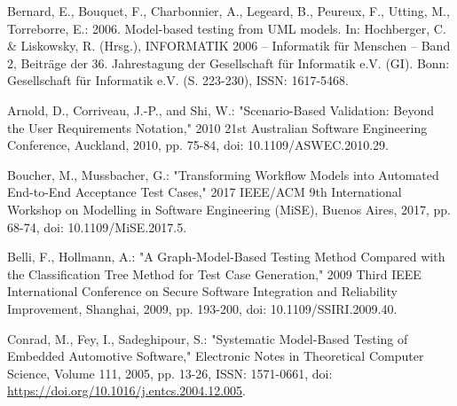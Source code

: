 \documentclass[a4paper,10pt, bibliography=totocnumbered]{scrreprt}
\begin{document}
\begin{thebibliography}{9}
 Bernard, E., Bouquet, F., Charbonnier, A., Legeard, B., Peureux, F., Utting, M., Torreborre, E.: 2006. Model-based testing from UML models. In: Hochberger, C. \& Liskowsky, R. (Hrsg.), INFORMATIK 2006 – Informatik für Menschen – Band 2, Beiträge der 36. Jahrestagung der Gesellschaft für Informatik e.V. (GI). Bonn: Gesellschaft für Informatik e.V. (S. 223-230),  ISSN: 1617-5468.





 Arnold, D., Corriveau, J.-P., and Shi, W.: "Scenario-Based Validation: Beyond the User Requirements Notation," 2010 21st Australian Software Engineering Conference, Auckland, 2010, pp. 75-84, doi: 10.1109/ASWEC.2010.29.

 Boucher, M., Mussbacher, G.: "Transforming Workflow Models into Automated End-to-End Acceptance Test Cases," 2017 IEEE/ACM 9th International Workshop on Modelling in Software Engineering (MiSE), Buenos Aires, 2017, pp. 68-74, doi: 10.1109/MiSE.2017.5.



Belli, F., Hollmann, A.: "A Graph-Model-Based Testing Method Compared with the Classification Tree Method for Test Case Generation," 2009 Third IEEE International Conference on Secure Software Integration and Reliability Improvement, Shanghai, 2009, pp. 193-200, doi: 10.1109/SSIRI.2009.40.

Conrad, M., Fey, I., Sadeghipour, S.: "Systematic Model-Based Testing of Embedded
Automotive Software," Electronic Notes in Theoretical Computer Science, Volume 111, 2005, pp. 13-26, ISSN: 1571-0661, doi: \url{https://doi.org/10.1016/j.entcs.2004.12.005}.


\end{thebibliography}

\listoffigures

\listoftables
\end{document}

